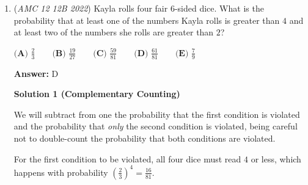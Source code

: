 \begin{enumerate}
 All arguments are even in the second equation for $f(2022)$, so the two $\cos$ terms are equal to $1$, and the two $\sin$ terms are equal to $0$. 

 Therefore the answer is $1+1=\boxed{\textbf{(E) } 2}.$

 -Benedict T (countmath1)

 



\textbf{Solution 7 (No Euler's Identity)}

Observe that $(\frac{-1+i\sqrt{3}}{2})^{2}=\frac{-1-i\sqrt{3}}{2}$ and $(\frac{-1-i\sqrt{3}}{2})^{2}=\frac{-1+i\sqrt{3}}{2}$. 

 It follows that $(\frac{-1+i\sqrt{3}}{2})^{4}=\frac{-1+i\sqrt{3}}{2}$ and $(\frac{-1-i\sqrt{3}}{2})^{4}=\frac{-1-i\sqrt{3}}{2}$. 

 The binary expansion of 2022 is 
 \[2^{10}+2^9+2^8+2^7+2^6+2^5+2^2+2^1\] which can be rewritten as 
 \[(4^5+4^4+4^3+4^1)+2(4^4+4^3+4^2+4^0)\] Thus, 
 \[(\frac{-1+i\sqrt{3}}{2})^{2022}=((\frac{-1+i\sqrt{3}}{2})^4)^4\cdot (((\frac{-1+i\sqrt{3}}{2})^4)^4)^2\] or 
 \[(\frac{-1+i\sqrt{3}}{2})(\frac{-1-i\sqrt{3}}{2})\] Similarly, 
 \[(\frac{-1-i\sqrt{3}}{2})^{2022}=(\frac{-1-i\sqrt{3}}{2})(\frac{-1+i\sqrt{3}}{2})\] so 
 \[f(2022)=2(\frac{-1+i\sqrt{3}}{2})(\frac{-1-i\sqrt{3}}{2})=\boxed{\textbf{(E) } 2}\]



	\item (\textit{AMC 12 12B 2022}) Kayla rolls four fair $6$-sided dice. What is the probability that at least one of the numbers Kayla rolls is greater than $4$ and at least two of the numbers she rolls are greater than $2$?


 $\textbf{(A) }\frac{2}{3} \qquad \textbf{(B) }\frac{19}{27} \qquad \textbf{(C) }\frac{59}{81} \qquad \textbf{(D) }\frac{61}{81} \qquad \textbf{(E) }\frac{7}{9}$

 \textbf{Answer: }D



\textbf{Solution 1 (Complementary Counting)}

We will subtract from one the probability that the first condition is violated and the probability that \textit{only} the second condition is violated, being careful not to double-count the probability that both conditions are violated.

 For the first condition to be violated, all four dice must read $4$ or less, which happens with probability $\left( \frac23 \right)^4 = \frac{16}{81}$.


\end{enumerate}
